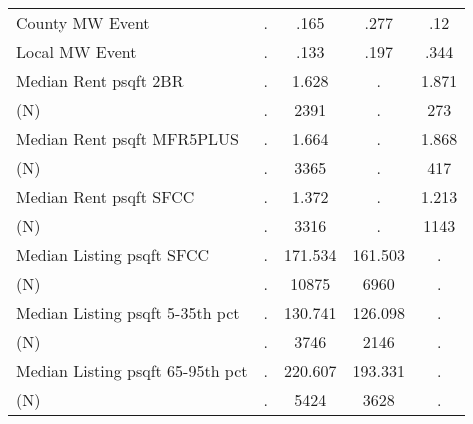 \begin{tabular}{l*{4}{c}}
County MW Event&           .&        .165&        .277&         .12\\
Local MW Event&           .&        .133&        .197&        .344\\
Median Rent psqft 2BR&           .&       1.628&           .&       1.871\\
(N)         &           .&        2391&           .&         273\\
Median Rent psqft MFR5PLUS&           .&       1.664&           .&       1.868\\
(N)         &           .&        3365&           .&         417\\
Median Rent psqft SFCC&           .&       1.372&           .&       1.213\\
(N)         &           .&        3316&           .&        1143\\
Median Listing psqft SFCC&           .&     171.534&     161.503&           .\\
(N)         &           .&       10875&        6960&           .\\
Median Listing psqft 5-35th pct&           .&     130.741&     126.098&           .\\
(N)         &           .&        3746&        2146&           .\\
Median Listing psqft 65-95th pct&           .&     220.607&     193.331&           .\\
(N)         &           .&        5424&        3628&           .\\
\hline\hline
\end{tabular}
